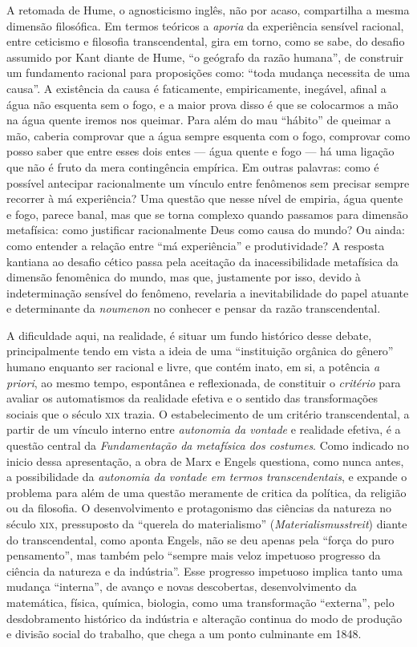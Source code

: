 A retomada de Hume, o agnosticismo inglês, não por acaso, compartilha a
mesma dimensão filosófica. Em termos teóricos a \emph{aporia} da
experiência sensível racional, entre ceticismo e filosofia
transcendental, gira em torno, como se sabe, do desafio assumido por
Kant diante de Hume, ``o geógrafo da razão humana'', de construir um
fundamento racional para proposições como: ``toda mudança necessita de
uma causa''. A existência da causa é faticamente, empiricamente,
inegável, afinal a água não esquenta sem o fogo, e a maior prova disso é
que se colocarmos a mão na água quente iremos nos queimar. Para além do
mau ``hábito'' de queimar a mão, caberia comprovar que a água sempre
esquenta com o fogo, comprovar como posso saber que entre esses dois
entes --- água quente e fogo --- há uma ligação que não é fruto da mera
contingência empírica. Em outras palavras: como é possível antecipar
racionalmente um vínculo entre fenômenos sem precisar sempre recorrer à
má experiência? Uma questão que nesse nível de empiria, água quente e
fogo, parece banal, mas que se torna complexo quando passamos para
dimensão metafísica: como justificar racionalmente Deus como causa do
mundo? Ou ainda: como entender a relação entre ``má experiência'' e
produtividade? A resposta kantiana ao desafio cético passa pela
aceitação da inacessibilidade metafísica da dimensão fenomênica do
mundo, mas que, justamente por isso, devido à indeterminação sensível do
fenômeno, revelaria a inevitabilidade do papel atuante e determinante da
\emph{noumenon} no conhecer e pensar da razão transcendental.

A dificuldade aqui, na realidade, é situar um fundo histórico desse
debate, principalmente tendo em vista a ideia de uma ``instituição
orgânica do gênero'' humano enquanto ser racional e livre, que contém
inato, em si, a potência \emph{a priori}, ao mesmo tempo, espontânea e
reflexionada, de constituir o \emph{critério} para avaliar os
automatismos da realidade efetiva e o sentido das transformações sociais
que o século \textsc{xix} trazia. O estabelecimento de um critério
transcendental, a partir de um vínculo interno entre \emph{autonomia da
vontade} e realidade efetiva, é a questão central da \emph{Fundamentação
da metafísica dos costumes}. Como indicado no inicio dessa apresentação,
a obra de Marx e Engels questiona, como nunca antes, a possibilidade da
\emph{autonomia da vontade em termos transcendentais}, e expande o
problema para além de uma questão meramente de critica da política, da
religião ou da filosofia. O desenvolvimento e protagonismo das ciências
da natureza no século \textsc{xix}, pressuposto da ``querela do materialismo''
(\emph{Materialismusstreit}) diante do transcendental, como aponta
Engels, não se deu apenas pela ``força do puro pensamento'', mas também
pelo ``sempre mais veloz impetuoso progresso da ciência da natureza e da
indústria''. Esse progresso impetuoso implica tanto uma mudança
``interna'', de avanço e novas descobertas, desenvolvimento da
matemática, física, química, biologia, como uma transformação
``externa'', pelo desdobramento histórico da indústria e alteração
continua do modo de produção e divisão social do trabalho, que chega a
um ponto culminante em 1848.

